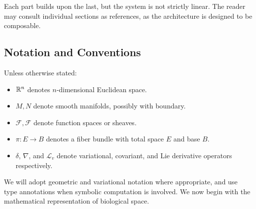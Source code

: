 Each part builds upon the last, but the system is not strictly linear. The reader may consult individual sections as references, as the architecture is designed to be composable.

\subsection{Notation and Conventions}

Unless otherwise stated:
\begin{itemize}
  \item $\mathbb{R}^n$ denotes $n$-dimensional Euclidean space.
  \item $M, N$ denote smooth manifolds, possibly with boundary.
  \item $\mathcal{F}, \mathscr{F}$ denote function spaces or sheaves.
  \item $\pi: E \to B$ denotes a fiber bundle with total space $E$ and base $B$.
  \item $\delta$, $\nabla$, and $\mathcal{L}_v$ denote variational, covariant, and Lie derivative operators respectively.
\end{itemize}

We will adopt geometric and variational notation where appropriate, and use type annotations when symbolic computation is involved. We now begin with the mathematical representation of biological space.